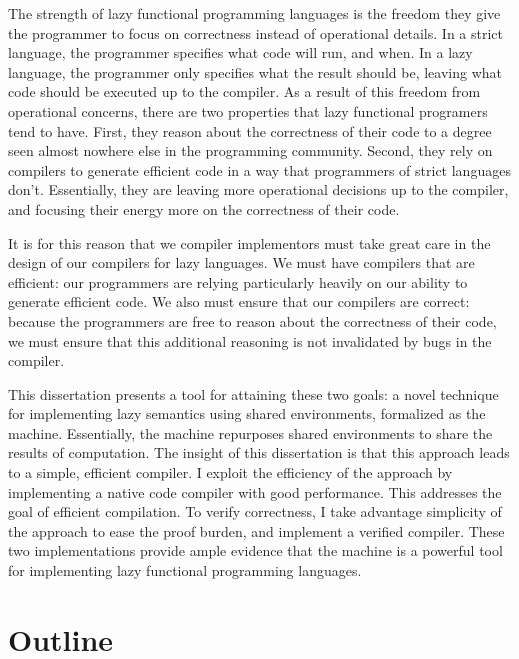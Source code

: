 The strength of lazy functional programming languages is the freedom they give
the programmer to focus on correctness instead of operational details. In a
strict language, the programmer specifies what code will run, and when. In a
lazy language, the programmer only specifies what the result should be, leaving
what code should be executed up to the compiler. As a result of this freedom
from operational concerns, there are two properties that lazy functional
programers tend to have. First, they reason about the correctness of their code
to a degree seen almost nowhere else in the programming community.  Second, they
rely on compilers to generate efficient code in a way that programmers of strict
languages don't.  Essentially, they are leaving more operational decisions up to
the compiler, and focusing their energy more on the correctness of their code. 

It is for this reason that we compiler implementors must take great care in the
design of our compilers for lazy languages. We must have compilers that are
efficient: our programmers are relying particularly heavily on our ability to
generate efficient code. We also must ensure that our compilers are correct:
because the programmers are free to reason about the correctness of their code,
we must ensure that this additional reasoning is not invalidated by bugs in the
compiler. 

This dissertation presents a tool for attaining these two goals: a novel
technique for implementing lazy semantics using shared environments, formalized
as the \ce machine. Essentially, the \ce machine repurposes shared environments
to share the results of computation. The insight of this dissertation is that
this approach leads to a simple, efficient compiler. I exploit the efficiency of
the approach by implementing a native code compiler with good performance. This
addresses the goal of efficient compilation. To verify correctness, I take
advantage simplicity of the approach to ease the proof burden, and implement a
verified compiler. These two implementations provide ample evidence that the \ce
machine is a powerful tool for implementing lazy functional programming
languages.

\section{Outline}

